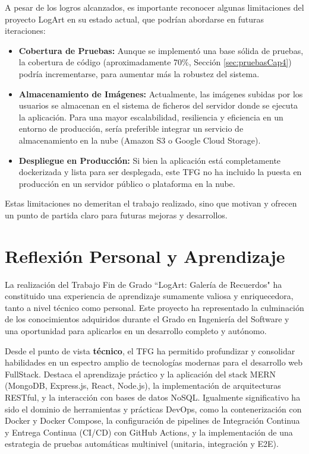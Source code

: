 A pesar de los logros alcanzados, es importante reconocer algunas limitaciones del proyecto LogArt en su estado actual, que podrían abordarse en futuras iteraciones:
\begin{itemize}
    \item \textbf{Cobertura de Pruebas:}
    Aunque se implementó una base sólida de pruebas, la cobertura de código (aproximadamente 70\%, Sección \ref{sec:pruebasCap4}) podría incrementarse, para aumentar más la robustez del sistema.
    \item \textbf{Almacenamiento de Imágenes:} Actualmente, las imágenes subidas por los usuarios se almacenan en el sistema de ficheros del servidor donde se ejecuta la aplicación. Para una mayor escalabilidad, resiliencia y eficiencia en un entorno de producción, sería preferible integrar un servicio de almacenamiento en la nube (Amazon S3 o Google Cloud Storage).
    \item \textbf{Despliegue en Producción:} Si bien la aplicación está completamente dockerizada y lista para ser desplegada, este TFG no ha incluido la puesta en producción en un servidor público o plataforma en la nube.
\end{itemize}
Estas limitaciones no demeritan el trabajo realizado, sino que motivan y ofrecen un punto de partida claro para futuras mejoras y desarrollos.

\section{Reflexión Personal y Aprendizaje}
\label{sec:reflexionPersonal}

La realización del Trabajo Fin de Grado ``LogArt: Galería de Recuerdos" ha constituido una experiencia de aprendizaje sumamente valiosa y enriquecedora, tanto a nivel técnico como personal. Este proyecto ha representado la culminación de los conocimientos adquiridos durante el Grado en Ingeniería del Software y una oportunidad para aplicarlos en un desarrollo completo y autónomo.

Desde el punto de vista \textbf{técnico}, el TFG ha permitido profundizar y consolidar habilidades en un espectro amplio de tecnologías modernas para el desarrollo web FullStack. Destaca el aprendizaje práctico y la aplicación del stack MERN (MongoDB, Express.js, React, Node.js), la implementación de arquitecturas RESTful, y la interacción con bases de datos NoSQL. Igualmente significativo ha sido el dominio de herramientas y prácticas DevOps, como la contenerización con Docker y Docker Compose, la configuración de pipelines de Integración Continua y Entrega Continua (CI/CD) con GitHub Actions, y la implementación de una estrategia de pruebas automáticas multinivel (unitaria, integración y E2E).

